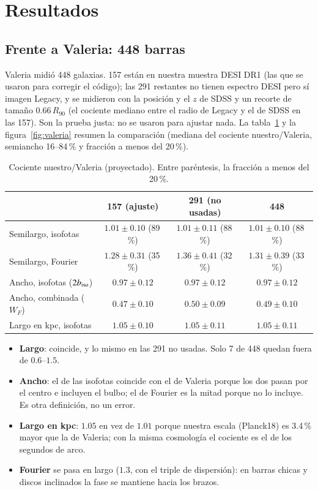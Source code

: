 \documentclass[11pt,a4paper]{article}
\begin{document}
\section{Resultados}\label{sec:resultados}

\subsection{Frente a Valeria: 448 barras}

Valeria midió 448 galaxias. 157 están en nuestra muestra DESI DR1 (las que se usaron para corregir el código);
las 291 restantes no tienen espectro DESI pero sí imagen Legacy, y se midieron con la posición y el $z$ de SDSS y
un recorte de tamaño $0.66\,R_{90}$ (el cociente mediano entre el radio de Legacy y el de SDSS en las 157). Son la
prueba justa: no se usaron para ajustar nada. La tabla~\ref{tab:valeria} y la figura~\ref{fig:valeria} resumen
la comparación (mediana del cociente nuestro/Valeria, semiancho 16--84\,\% y fracción a menos del 20\,\%).

\begin{table}[h]
\centering
\begin{tabular}{lccc}
\toprule
 & 157 (ajuste) & 291 (no usadas) & 448 \\
\midrule
Semilargo, isofotas & $1.01\pm0.10$ (89\,\%) & $1.01\pm0.11$ (88\,\%) & $1.01\pm0.10$ (88\,\%) \\
Semilargo, Fourier & $1.28\pm0.31$ (35\,\%) & $1.36\pm0.41$ (32\,\%) & $1.31\pm0.39$ (33\,\%) \\
Ancho, isofotas ($2b_{\rm iso}$) & $0.97\pm0.12$ & $0.97\pm0.12$ & $0.97\pm0.12$ \\
Ancho, combinada ($W_F$) & $0.47\pm0.10$ & $0.50\pm0.09$ & $0.49\pm0.10$ \\
Largo en kpc, isofotas & $1.05\pm0.10$ & $1.05\pm0.11$ & $1.05\pm0.11$ \\
\bottomrule
\end{tabular}
\caption{Cociente nuestro/Valeria (proyectado). Entre paréntesis, la fracción a menos del 20\,\%.}
\label{tab:valeria}
\end{table}

\begin{itemize}
\item \textbf{Largo}: coincide, y lo mismo en las 291 no usadas. Solo 7 de 448 quedan fuera de $0.6$--$1.5$.
\item \textbf{Ancho}: el de las isofotas coincide con el de Valeria porque los dos pasan por el centro e incluyen
el bulbo; el de Fourier es la mitad porque no lo incluye. Es otra definición, no un error.
\item \textbf{Largo en kpc}: $1.05$ en vez de $1.01$ porque nuestra escala (Planck18) es 3.4\,\% mayor que la de
Valeria; con la misma cosmología el cociente es el de los segundos de arco.
\item \textbf{Fourier} se pasa en largo ($1.3$, con el triple de dispersión): en barras chicas y discos inclinados
la fase se mantiene hacia los brazos.
\end{itemize}
\end{document}
